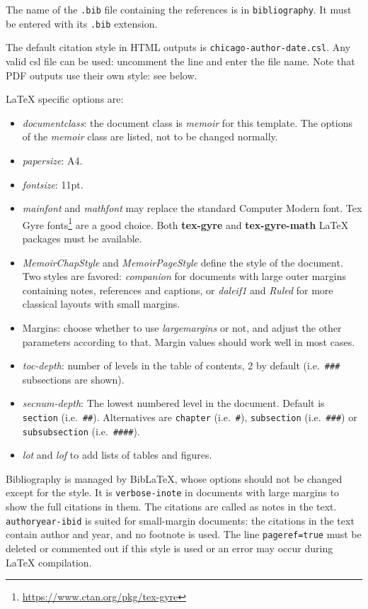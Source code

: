 \documentclass[
  12pt,
  american,
  a4paper,
  extrafontsizes,onecolumn,openright
  ]{memoir}
\providecommand{\tightlist}{%
  \setlength{\itemsep}{0pt}\setlength{\parskip}{0pt}}
\begin{document}
The name of the \texttt{.bib} file containing the references is in \texttt{bibliography}.
It must be entered with its \texttt{.bib} extension.

The default citation style in HTML outputs is \texttt{chicago-author-date.csl}.
Any valid csl file can be used: uncomment the line and enter the file name.
Note that PDF outputs use their own style: see below.

LaTeX specific options are:

\begin{itemize}
\tightlist
\item
  \emph{documentclass}: the document class is \emph{memoir} for this template.
  The options of the \emph{memoir} class are listed, not to be changed normally.
\item
  \emph{papersize}: A4.
\item
  \emph{fontsize}: 11pt.
\item
  \emph{mainfont} and \emph{mathfont} may replace the standard Computer Modern font.
  Tex Gyre fonts\footnote{\url{https://www.ctan.org/pkg/tex-gyre}} are a good choice.
  Both \textbf{tex-gyre} and \textbf{tex-gyre-math} LaTeX packages must be available.
\item
  \emph{MemoirChapStyle} and \emph{MemoirPageStyle} define the style of the document.
  Two styles are favored: \emph{companion} for documents with large outer margins containing notes, references and captions, or \emph{daleif1} and \emph{Ruled} for more classical layouts with small margins.
\item
  Margins: choose whether to use \emph{largemargins} or not, and adjust the other parameters according to that.
  Margin values should work well in most cases.
\item
  \emph{toc-depth}: number of levels in the table of contents, 2 by default (i.e.~\texttt{\#\#\#} subsections are shown).
\item
  \emph{secnum-depth}: The lowest numbered level in the document. Default is \texttt{section} (i.e.~\texttt{\#\#}).
  Alternatives are \texttt{chapter} (i.e.~\texttt{\#}), \texttt{subsection} (i.e.~\texttt{\#\#\#}) or \texttt{subsubsection} (i.e.~\texttt{\#\#\#\#}).
\item
  \emph{lot} and \emph{lof} to add lists of tables and figures.
\end{itemize}

Bibliography is managed by BibLaTeX, whose options should not be changed except for the style.
It is \texttt{verbose-inote} in documents with large margins to show the full citations in them.
The citations are called as notes in the text.
\texttt{authoryear-ibid} is suited for small-margin documents: the citations in the text contain author and year, and no footnote is used.
The line \texttt{pageref=true} must be deleted or commented out if this style is used or an error may occur during LaTeX compilation.
\end{document}

